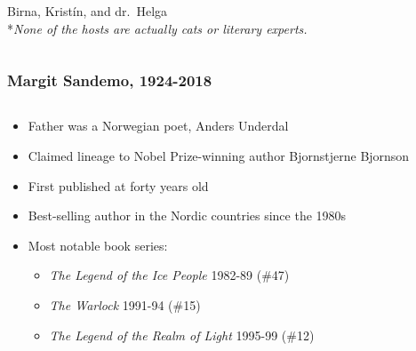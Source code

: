 \documentclass{beamer}
\begin{document}
\begin{frame}
\begin{columns}[T]
\begin{column}{0.45\textwidth}
                \vfill
                Birna, Krist\'{i}n, and dr.~Helga\\
                \vspace{12pt}
                \footnotesize{*\emph{None of the hosts are actually cats or literary experts.}}
            \end{column}
        \end{columns}
    \end{frame}

    \begin{frame}
        \frametitle{Margit Sandemo, 1924-2018}
        \begin{columns}[T]
            \begin{column}{0.55\textwidth}
                \begin{itemize}
                    \item Father was a Norwegian poet, Anders Underdal
                    \item Claimed lineage to Nobel Prize-winning author Bjornstjerne Bjornson
                    \item First published at forty years old
                    \item Best-selling author in the Nordic countries since the 1980s
                    \item Most notable book series:
                    \begin{itemize}
                        \item \emph{The Legend of the Ice People} 1982-89 (\#47)
                        \item \emph{The Warlock} 1991-94 (\#15)
                        \item \emph{The Legend of the Realm of Light} 1995-99 (\#12)
                    \end{itemize}
                \end{itemize}
            \end{column}
            \begin{column}{0.45\textwidth}
                \centering

\end{column}
\end{columns}
\end{frame}
\end{document}
